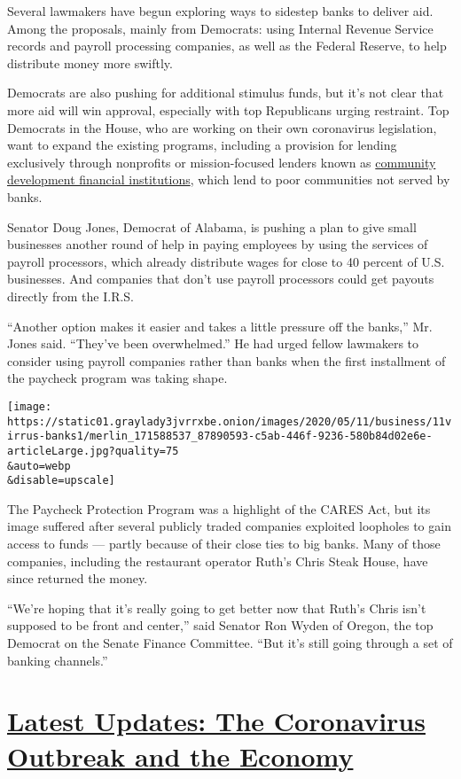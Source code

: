 Several lawmakers have begun exploring ways to sidestep banks to deliver
aid. Among the proposals, mainly from Democrats: using Internal Revenue
Service records and payroll processing companies, as well as the Federal
Reserve, to help distribute money more swiftly.

Democrats are also pushing for additional stimulus funds, but it's not
clear that more aid will win approval, especially with top Republicans
urging restraint. Top Democrats in the House, who are working on their
own coronavirus legislation, want to expand the existing programs,
including a provision for lending exclusively through nonprofits or
mission-focused lenders known as
\href{https://www.nytimes3xbfgragh.onion/2020/06/04/business/minority-businesses-damage-lenders.html}{community
development financial institutions}, which lend to poor communities not
served by banks.

Senator Doug Jones, Democrat of Alabama, is pushing a plan to give small
businesses another round of help in paying employees by using the
services of payroll processors, which already distribute wages for close
to 40 percent of U.S. businesses. And companies that don't use payroll
processors could get payouts directly from the I.R.S.

``Another option makes it easier and takes a little pressure off the
banks,'' Mr. Jones said. ``They've been overwhelmed.'' He had urged
fellow lawmakers to consider using payroll companies rather than banks
when the first installment of the paycheck program was taking shape.

\texttt{[image: https://static01.graylady3jvrrxbe.onion/images/2020/05/11/business/11virrus-banks1/merlin\_171588537\_87890593-c5ab-446f-9236-580b84d02e6e-articleLarge.jpg?quality=75\\\&auto=webp\\\&disable=upscale]}

The Paycheck Protection Program was a highlight of the CARES Act, but
its image suffered after several publicly traded companies exploited
loopholes to gain access to funds --- partly because of their close ties
to big banks. Many of those companies, including the restaurant operator
Ruth's Chris Steak House, have since returned the money.

``We're hoping that it's really going to get better now that Ruth's
Chris isn't supposed to be front and center,'' said Senator Ron Wyden of
Oregon, the top Democrat on the Senate Finance Committee. ``But it's
still going through a set of banking channels.''

\hypertarget{latest-updates-the-coronavirus-outbreak-and-the-economy}{%
\section{\texorpdfstring{\href{https://www.nytimes3xbfgragh.onion/live/2020/09/08/business/stock-market-today-coronavirus?action=click\&pgtype=Article\&state=default\&region=MAIN_CONTENT_1\&context=storylines_live_updates}{Latest
Updates: The Coronavirus Outbreak and the
Economy}}{Latest Updates: The Coronavirus Outbreak and the Economy}}\label{latest-updates-the-coronavirus-outbreak-and-the-economy}}

